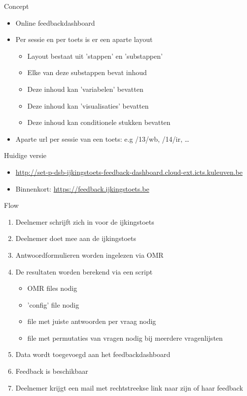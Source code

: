 \documentclass{beamer}
\begin{document}
\begin{frame}{Concept}
	\begin{itemize}
        \item Online feedbackdashboard
		\item Per sessie en per toets is er een aparte layout
			\begin{itemize}
				\item Layout bestaat uit 'stappen' en 'substappen'
				\item Elke van deze substappen bevat inhoud
                \item Deze inhoud kan 'variabelen' bevatten
                \item Deze inhoud kan 'visualisaties' bevatten
                \item Deze inhoud kan conditionele stukken bevatten
			\end{itemize}
        \item Aparte url per sessie van een toets: e.g /13/wb, /14/ir, \ldots 
	\end{itemize}
     \begin{block}{Huidige versie}
        \begin{itemize}
        \item \url{http://set-p-dsb-ijkingstoets-feedback-dashboard.cloud-ext.icts.kuleuven.be}
        \item Binnenkort: \url{https://feedback.ijkingstoets.be}
        \end{itemize}
      \end{block}
\end{frame}

\begin{frame}{Flow}
	\begin{enumerate}
        \item Deelnemer schrijft zich in voor de ijkingstoets
		\item Deelnemer doet mee aan de ijkingstoets
        \item Antwoordformulieren worden ingelezen via OMR
        \item De resultaten worden berekend via een script
        \begin{itemize}
            \item OMR files nodig
            \item 'config' file nodig
            \item file met juiste antwoorden per vraag nodig
            \item file met permutaties van vragen nodig bij meerdere vragenlijsten  
        \end{itemize}
        \item Data wordt toegevoegd aan het feedbackdashboard
        \item Feedback is beschikbaar
        \item Deelnemer krijgt een mail met rechtstreekse link naar zijn of haar feedback
	\end{enumerate}
\end{frame}
\end{document}
